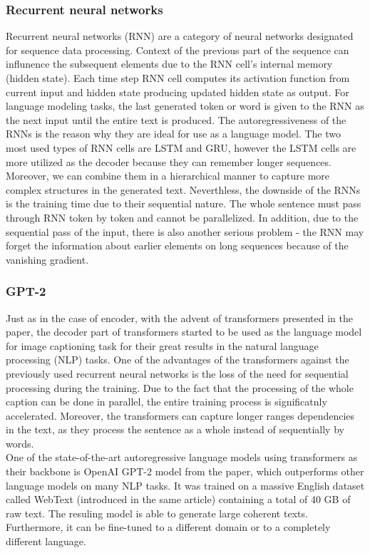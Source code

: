 \subsubsection{Recurrent neural networks}
Recurrent neural networks (RNN)\citep{rumelhart1985learning} are a category of neural networks designated for sequence data processing. Context of the previous part of the sequence can influnence the subsequent elements due to the RNN cell's internal memory (hidden state). Each time step RNN cell computes its activation function from current input and hidden state producing updated hidden state as output. For language modeling tasks, the last generated token or word is given to the RNN as the next input until the entire text is produced. The autoregressiveness of the RNNs is the reason why they are ideal for use as a language model. The two most used types of RNN cells are LSTM\citep{hochreiter1997long} and GRU\citep{cho2014learning}, however the LSTM cells are more utilized as the decoder because they can remember longer sequences. Moreover, we can combine them in a hierarchical manner to capture more complex structures in the generated text. Neverthless, the downside of the RNNs is the training time due to their sequential nature. The whole sentence must pass through RNN token by token and cannot be parallelized. In addition, due to the sequential pass of the input, there is also another serious problem - the RNN may forget the information about earlier  elements on long sequences because of the vanishing gradient.

\subsubsection{GPT-2}
Just as in the case of encoder, with the advent of transformers presented in the \citet{vaswani2017attention} paper, the decoder part of transformers started to be used as the language model for image captioning task for their great results in the natural language processing (NLP) tasks. One of the advantages of the transformers against the previously used recurrent neural networks is the loss of the need for sequential processing during the training. Due to the fact that the processing of the whole caption can be done in parallel, the entire training process is significatnly accelerated. Moreover, the transformers can capture longer ranges dependencies in the text, as they process the sentence as a whole instead of sequentially by words.\\

One of the state-of-the-art autoregressive language models using transformers as their backbone is OpenAI GPT-2 model from the \citet{radford2019language} paper, which outperforms other language models on many NLP tasks. It was trained on a massive English dataset called WebText (introduced in the same article) containing a total of 40 GB of raw text. The resuling model is able to generate large coherent texts. Furthermore, it can be fine-tuned to a different domain or to a completely different language.

